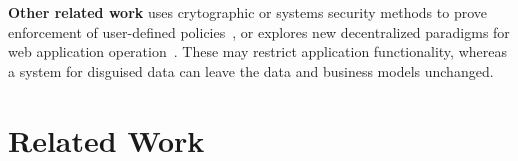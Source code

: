 \textbf{Other related work} uses crytographic or systems security methods to
prove enforcement of user-defined policies~\cite{zeph, riverbed}, or explores
new decentralized paradigms for web application operation~\cite{solid, bstore,
databox, diy, amber, oort, w5, blockstack}.  These may restrict application
functionality, whereas a system for disguised data can leave the data and business models unchanged.
%
%
%
%
%

\iffalse
\section{Related Work}
\label{sec:related}
\let\rwhighlight\relax

